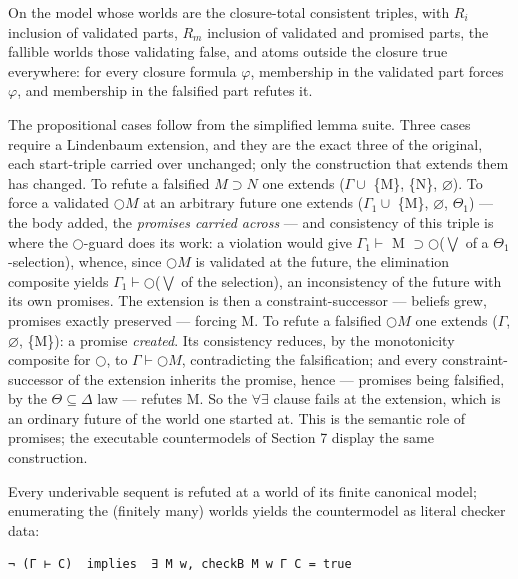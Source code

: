 \begin{theorem}\label{thm:truth}
On the model whose
worlds are the closure-total consistent triples, with \ensuremath{R_{i}} inclusion of
validated parts, \ensuremath{R_{m}} inclusion of validated and promised parts, the
fallible worlds those validating false, and atoms outside the closure
true everywhere: for every closure formula \ensuremath{\varphi}, membership in the
validated part forces \ensuremath{\varphi}, and membership in the falsified part refutes
it.
\end{theorem}

The propositional cases follow from the simplified lemma suite. Three cases
require a Lindenbaum extension, and they are the exact three of the
original, each start-triple carried over unchanged; only the construction
that extends them has changed. To refute a falsified \ensuremath{M \supset N} one extends
(\ensuremath{\Gamma \cup} \{M\}, \{N\}, \ensuremath{\varnothing}). To force a validated \ensuremath{\bigcirc M} at an arbitrary future one
extends (\ensuremath{\Gamma{}_{1} \cup} \{M\}, \ensuremath{\varnothing}, \ensuremath{\Theta{}_{1}}) --- the body added, the \emph{promises carried
across} --- and consistency of this triple is where the \ensuremath{\bigcirc}-guard does its work: a
violation would give \ensuremath{\Gamma{}_{1} \vdash} M \ensuremath{\supset \bigcirc}(\ensuremath{\bigvee} of a \ensuremath{\Theta{}_{1}}-selection), whence, since \ensuremath{\bigcirc M}
is validated at the future, the elimination composite yields
\ensuremath{\Gamma{}_{1} \vdash \bigcirc}(\ensuremath{\bigvee} of the selection), an inconsistency of the future with its own
promises. The extension is then a constraint-successor --- beliefs grew,
promises exactly preserved --- forcing M. To refute a falsified \ensuremath{\bigcirc M} one
extends (\ensuremath{\Gamma}, \ensuremath{\varnothing}, \{M\}): a promise \emph{created}. Its consistency reduces, by
the monotonicity composite for \ensuremath{\bigcirc}, to \ensuremath{\Gamma \vdash \bigcirc M}, contradicting the
falsification; and every constraint-successor of the extension inherits
the promise, hence --- promises being falsified, by the \ensuremath{\Theta \subseteq \Delta} law ---
refutes M. So the \ensuremath{\forall\exists} clause fails at the extension, which is an
ordinary future of the world one started at. This is the semantic role
of promises; the executable countermodels
of Section 7 display the same construction.

\begin{corollary}\label{cor:emitter}
Every underivable sequent is refuted at a
world of its finite canonical model; enumerating the (finitely many)
worlds yields the countermodel as literal checker data:

\begin{lstlisting}
¬ (Γ ⊢ C)  implies  ∃ M w, checkB M w Γ C = true
\end{lstlisting}
\end{corollary}

